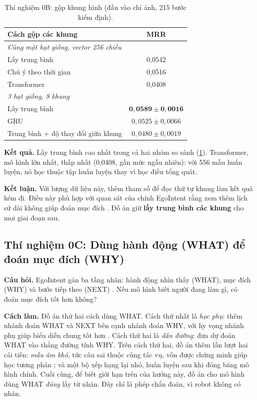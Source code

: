 \documentclass[a4paper,oneside]{report}
\begin{document}
\begin{table}[ht]
\centering
\caption{Thí nghiệm 0B: gộp khung hình (đầu vào chỉ ảnh, 215 bước kiểm định).}
\label{tab:stage0b}
\small
\begin{tabular}{lc}
\toprule
Cách gộp các khung & MRR \\
\midrule
\multicolumn{2}{l}{\textit{Cùng một hạt giống, vector 256 chiều}} \\
Lấy trung bình & 0,0542 \\
Chú ý theo thời gian & 0,0516 \\
Transformer & 0,0408 \\
\midrule
\multicolumn{2}{l}{\textit{3 hạt giống, 8 khung}} \\
Lấy trung bình & $\mathbf{0{,}0589 \pm 0{,}0016}$ \\
GRU & $0{,}0525 \pm 0{,}0066$ \\
Trung bình + độ thay đổi giữa khung & $0{,}0480 \pm 0{,}0019$ \\
\bottomrule
\end{tabular}
\end{table}

\textbf{Kết quả.} Lấy trung bình cao nhất trong cả hai nhóm so sánh (\cref{tab:stage0b}). Transformer, mô hình lớn nhất, thấp nhất (0,0408, gần mức ngẫu nhiên): với 556 mẫu huấn luyện, nó học thuộc tập huấn luyện thay vì học điều tổng quát.

\textbf{Kết luận.} Với lượng dữ liệu này, thêm tham số để đọc thứ tự khung làm kết quả kém đi. Điều này phù hợp với quan sát của chính EgoIntent rằng xem thêm lịch sử dài không giúp đoán mục đích \citep{egointent2026}. Đồ án giữ \textbf{lấy trung bình các khung} cho mọi giai đoạn sau.

\subsection{Thí nghiệm 0C: Dùng hành động (WHAT) để đoán mục đích (WHY)}

\textbf{Câu hỏi.} EgoIntent gán ba tầng nhãn: hành động nhìn thấy (WHAT), mục đích (WHY) và bước tiếp theo (NEXT) \citep{egointent2026}. Nếu mô hình biết người đang làm gì, có đoán mục đích tốt hơn không?

\textbf{Cách làm.} Đồ án thử hai cách dùng WHAT. Cách thứ nhất là \textit{học phụ}: thêm nhánh đoán WHAT và NEXT bên cạnh nhánh đoán WHY, với hy vọng nhánh phụ giúp biểu diễn chung tốt hơn \citep{caruana1997multitask}. Cách thứ hai là \textit{dẫn đường}: đưa dự đoán WHAT vào thẳng đường tính WHY. Trên cách thứ hai, đồ án thêm lần lượt hai cải tiến: \textit{mẫu âm khó}, tức câu sai thuộc cùng tác vụ, vốn được chứng minh giúp học tương phản \citep{robinson2021hard}; và một bộ xếp hạng lại nhỏ, huấn luyện sau khi đóng băng mô hình chính. Cuối cùng, để biết giới hạn trên của hướng này, đồ án cho mô hình dùng WHAT \textit{đúng} lấy từ nhãn. Đây chỉ là phép chẩn đoán, vì robot không có nhãn.
\end{document}
